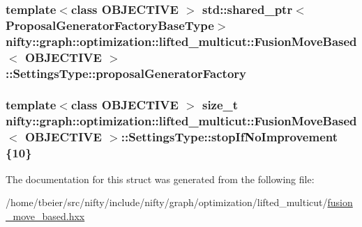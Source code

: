 \subsubsection[{proposal\+Generator\+Factory}]{\setlength{\rightskip}{0pt plus 5cm}template$<$class O\+B\+J\+E\+C\+T\+I\+V\+E $>$ std\+::shared\+\_\+ptr$<${\bf Proposal\+Generator\+Factory\+Base\+Type}$>$ {\bf nifty\+::graph\+::optimization\+::lifted\+\_\+multicut\+::\+Fusion\+Move\+Based}$<$ O\+B\+J\+E\+C\+T\+I\+V\+E $>$\+::Settings\+Type\+::proposal\+Generator\+Factory}\label{structnifty_1_1graph_1_1optimization_1_1lifted__multicut_1_1FusionMoveBased_1_1SettingsType_a06128f5a737807cf50f3052643818e60}
\hypertarget{structnifty_1_1graph_1_1optimization_1_1lifted__multicut_1_1FusionMoveBased_1_1SettingsType_a36f79a9a21dfb8f914cc1f556c9d8fe6}{}
\subsubsection[{stop\+If\+No\+Improvement}]{\setlength{\rightskip}{0pt plus 5cm}template$<$class O\+B\+J\+E\+C\+T\+I\+V\+E $>$ size\+\_\+t {\bf nifty\+::graph\+::optimization\+::lifted\+\_\+multicut\+::\+Fusion\+Move\+Based}$<$ O\+B\+J\+E\+C\+T\+I\+V\+E $>$\+::Settings\+Type\+::stop\+If\+No\+Improvement \{10\}}\label{structnifty_1_1graph_1_1optimization_1_1lifted__multicut_1_1FusionMoveBased_1_1SettingsType_a36f79a9a21dfb8f914cc1f556c9d8fe6}


The documentation for this struct was generated from the following file\+:\begin{DoxyCompactItemize}
\item 
/home/tbeier/src/nifty/include/nifty/graph/optimization/lifted\+\_\+multicut/\hyperlink{lifted__multicut_2fusion__move__based_8hxx}{fusion\+\_\+move\+\_\+based.\+hxx}\end{DoxyCompactItemize}
